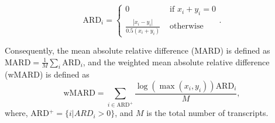 \begin{equation}
  \text{ARD}_i =
  \begin{cases}
    0                                            & \text{ if } x_i + y_i  = 0 \\
    \frac{\left|x_i - y_i\right|}{0.5 \left(x_i + y_i\right)} & \text{ otherwise }
  \end{cases}.
\end{equation}

Consequently, the mean absolute relative difference (MARD) is defined as $\text{MARD} = \frac{1}{M} \sum_{i} \text{ARD}_i$, and the weighted mean absolute relative difference (wMARD) is defined as
%
\begin{equation}
  \text{wMARD} = \sum_{i \in \text{ARD}^{+}}
    \frac{\log\left(\max\left(x_i, y_i\right)\right) \text{ARD}_i}{M},
\end{equation}
%
where, ARD$^{+} = \{i | ARD_i > 0\}$, and $M$ is the total number of transcripts.
